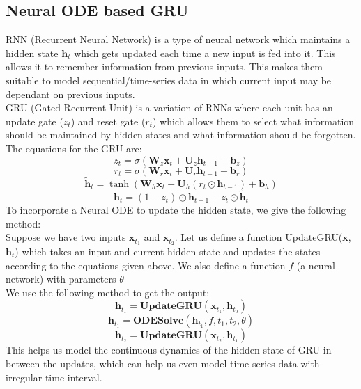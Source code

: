 \documentclass[12pt]{article}
\begin{document}
		\subsection{Neural ODE based GRU}
			\footnotesize{RNN (Recurrent Neural Network) is a type of neural network which maintains a hidden state $\mathbf{h}_t$ which gets updated each time a new input is fed into it. This allows it to remember information from previous inputs. This makes them suitable to model sequential/time-series data in which current input may be dependant on previous inputs.
			\\
			GRU (Gated Recurrent Unit) is a variation of RNNs where each unit has an update gate ($z_t$) and reset gate ($r_t$) which allows them to select what information should be maintained by hidden states and what information should be forgotten. The equations for the GRU are:
			\begin{equation}
				z_t = \sigma(\mathbf{W}_z \mathbf{x}_t + \mathbf{U}_z \mathbf{h}_{t-1} + \mathbf{b}_z)
			\end{equation}
			\begin{equation}
				r_t = \sigma(\mathbf{W}_r \mathbf{x}_t + \mathbf{U}_r \mathbf{h}_{t-1} + \mathbf{b}_r)
			\end{equation}
			\begin{equation}
				\tilde{\mathbf{h}}_t = \tanh(\mathbf{W}_h \mathbf{x}_t + \mathbf{U}_h (r_t \odot \mathbf{h}_{t-1}) + \mathbf{b}_h)
			\end{equation}
			\begin{equation}
				\mathbf{h}_t = (1 - z_t) \odot \mathbf{h}_{t-1} + z_t \odot \tilde{\mathbf{h}}_t
			\end{equation}
			To incorporate a Neural ODE to update the hidden state, we give the following method:
			\\
			Suppose we have two inputs $\mathbf{x}_{t_1}$ and $\mathbf{x}_{t_2}$. Let us define a function UpdateGRU($\mathbf{x}$, $\mathbf{h}_t$) which takes an input and current hidden state and updates the states according to the equations given above. We also define a function $f$ (a neural network) with parameters $\theta$
			\\
			We use the following method to get the output:
			\begin{equation*}
				\mathbf{h}_{t_1} = \mathbf{UpdateGRU}(\mathbf{x}_{t_1}, \mathbf{h}_{t_0})
			\end{equation*}
			\begin{equation*}
				\mathbf{h}_{t_1} = \mathbf{ODESolve}(\mathbf{h}_{t_1}, f, t_1, t_2, \theta)
			\end{equation*}
			\begin{equation*}
				\mathbf{h}_{t_2} = \mathbf{UpdateGRU}(\mathbf{x}_{t_2}, \mathbf{h}_{t_1})
			\end{equation*}
			This helps us model the continuous dynamics of the hidden state of GRU in between the updates, which can help us even model time series data with irregular time interval.}
			
			
	
\end{document}

